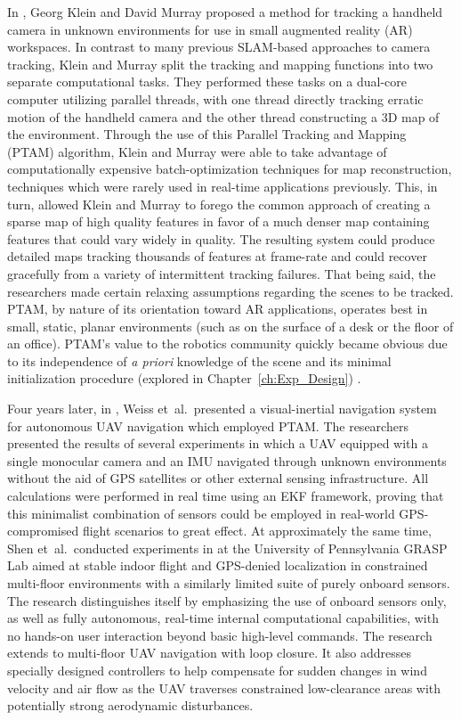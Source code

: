 In \cite{Klein2007}, Georg Klein and David Murray proposed a method for tracking a handheld camera in unknown environments for use in small augmented reality (AR) workspaces. In contrast to many previous SLAM-based approaches to camera tracking, Klein and Murray split the tracking and mapping functions into two separate computational tasks. They performed these tasks on a dual-core computer utilizing parallel threads, with one thread directly tracking erratic motion of the handheld camera and the other thread constructing a 3D map of the environment. Through the use of this Parallel Tracking and Mapping (PTAM) algorithm, Klein and Murray were able to take advantage of computationally expensive batch-optimization techniques for map reconstruction, techniques which were rarely used in real-time applications previously. This, in turn, allowed Klein and Murray to forego the common approach of creating a sparse map of high quality features in favor of a much denser map containing features that could vary widely in quality. The resulting system could produce detailed maps tracking thousands of features at frame-rate and could recover gracefully from a variety of intermittent tracking failures. That being said, the researchers made certain relaxing assumptions regarding the scenes to be tracked. PTAM, by nature of its orientation toward AR applications, operates best in small, static, planar environments (such as on the surface of a desk or the floor of an office). PTAM's value to the robotics community quickly became obvious due to its independence of \textit{a priori} knowledge of the scene and its minimal initialization procedure (explored in Chapter~\ref{ch:Exp_Design}) . 

Four years later, in \cite{Weiss2011}, Weiss et~al.\ presented a visual-inertial navigation system for autonomous UAV navigation which employed PTAM. The researchers presented the results of several experiments in which a UAV equipped with a single monocular camera and an IMU navigated through unknown environments without the aid of GPS satellites or other external sensing infrastructure. All calculations were performed in real time using an EKF framework, proving that this minimalist combination of sensors could be employed in real-world GPS-compromised flight scenarios to great effect. At approximately the same time, Shen et~al.\ conducted experiments in \cite{Shen2011} at the University of Pennsylvania GRASP Lab aimed at stable indoor flight and GPS-denied localization in constrained multi-floor environments with a similarly limited suite of purely onboard sensors. The research distinguishes itself by emphasizing the use of onboard sensors only, as well as fully autonomous, real-time internal computational capabilities, with no hands-on user interaction beyond basic high-level commands. The research extends to multi-floor UAV navigation with loop closure. It also addresses specially designed controllers to help compensate for sudden changes in wind velocity and air flow as the UAV traverses constrained low-clearance areas with potentially strong aerodynamic disturbances.

